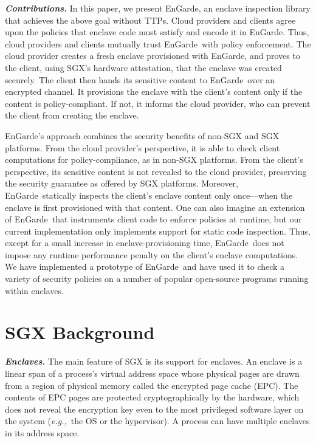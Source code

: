 \documentclass[conference,compsoc]{IEEEtran}
\newcommand{\myparagraph}[1]{\parskip -4pt \indent\par\noindent\textbf{\textit{#1}} \parskip 0pt}
\newcommand{\eg}{\textit{e.g.,}\xspace}
\newcommand{\tool}{EnGarde\xspace} %
\begin{document}
\myparagraph{Contributions.} In this paper, we present \tool, an enclave
inspection library that achieves the above goal without TTPs.  Cloud providers
and clients agree upon the policies that enclave code must satisfy and encode
it in \tool. Thus, cloud providers and clients mutually trust \tool\ with
policy enforcement. The cloud provider creates a fresh enclave provisioned with
\tool, and proves to the client, using SGX's hardware attestation, that the
enclave was created securely. The client then hands its sensitive content to
\tool\ over an encrypted channel. It provisions the enclave with the client's
content only if the content is policy-compliant. If not, it informs the cloud
provider, who can prevent the client from creating the enclave. 

\tool's approach combines the security benefits of non-SGX and SGX platforms.
From the cloud provider's perspective, it is able to check client computations
for policy-compliance, as in non-SGX platforms. From the client's perspective,
its sensitive content is not revealed to the cloud provider, preserving the
security guarantee as offered by SGX platforms. Moreover, \tool\ statically
inspects the client's enclave content only once---when the enclave is first
provisioned with that content. One can also imagine an extension of \tool\ that
instruments client code to enforce policies at runtime, but our current
implementation only implements support for static code inspection.  Thus,
except for a small increase in enclave-provisioning time, \tool\ does not
impose any runtime performance penalty on the client's enclave computations.
We have implemented a prototype of \tool\ and have used it to check a variety
of security policies on a number of popular open-source programs running within
enclaves.

% 

\section{SGX Background}
\label{section:background}

\myparagraph{Enclaves.} 
%
The main feature of SGX is its support for enclaves. An enclave is a linear
span of a process's virtual address space whose physical pages are drawn from a
region of physical memory called the encrypted page cache (EPC). The contents
of EPC pages are protected cryptographically by the hardware, which does not
reveal the encryption key even to the most privileged software layer on the
system (\eg~the OS or the hypervisor). A process can have multiple enclaves in
its address space.
\end{document}
